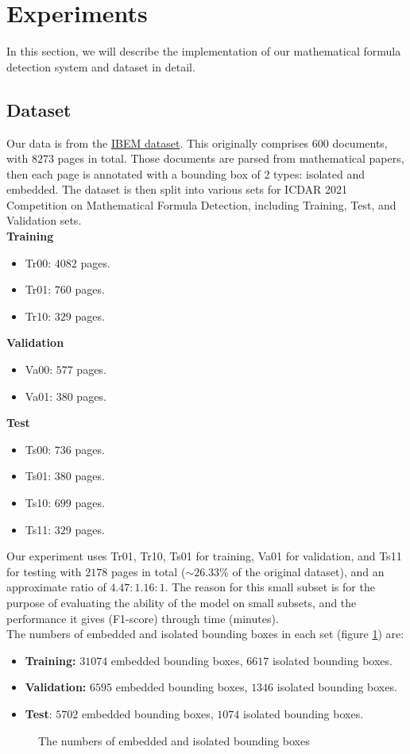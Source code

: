 \section{Experiments}
In this section, we will describe the implementation of our mathematical formula detection system and dataset in detail.
\subsection{Dataset}
Our data is from the \href{https://zenodo.org/record/4757865}{IBEM dataset}. This originally comprises $600$ documents, with $8273$ pages in total. Those documents are parsed from mathematical papers, then each page is annotated with a bounding box of 2 types: isolated and embedded. The dataset is then split into various sets for ICDAR 2021 Competition on Mathematical Formula Detection, including Training, Test, and Validation sets. \\
\textbf{Training}
\begin{itemize}
\item Tr00: $4082$ pages.
\item Tr01: $760$ pages.
\item Tr10: $329$ pages.
\end{itemize}
\textbf{Validation}
\begin{itemize}
\item Va00: $577$ pages.
\item Va01: $380$ pages.
\end{itemize}
\textbf{Test}
\begin{itemize}
\item Ts00: $736$ pages.
\item Ts01: $380$ pages.
\item Ts10: $699$ pages.
\item Ts11: $329$ pages.
\end{itemize}
Our experiment uses Tr01, Tr10, Ts01 for training, Va01 for validation, and Ts11 for testing with $2178$ pages in total ($ \sim 26.33\% $ of the original dataset), and an approximate ratio of $4.47:1.16:1.$ The reason for this small subset is for the purpose of evaluating the ability of the model on small subsets, and the performance it gives (F1-score) through time (minutes).\\
The numbers of embedded and isolated bounding boxes in each set (figure \ref{numbers})  are:
\begin{itemize}
\item \textbf{Training:} $31074$ embedded bounding boxes, $6617$ isolated bounding boxes.
\item \textbf{Validation:} $6595$ embedded bounding boxes, $1346$ isolated bounding boxes.
\item \textbf{Test}: $5702$ embedded bounding boxes, $1074$ isolated bounding boxes.
\end{itemize}
\begin{figure}[H]
\caption{The numbers of embedded and isolated bounding boxes}
\label{numbers}
\end{figure}

